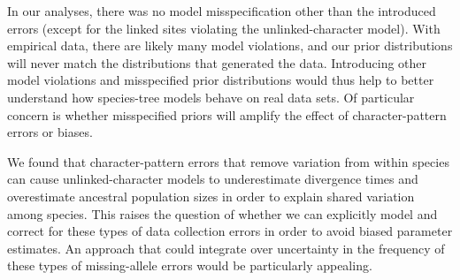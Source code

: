 In our analyses, there was no model misspecification other than the introduced
errors (except for the linked sites violating the unlinked-character model).
With empirical data, there are likely many model violations,
and our prior distributions will never match the distributions that generated
the data.
Introducing other model violations and misspecified prior distributions
would thus help to better understand how species-tree models behave on real
data sets.
Of particular concern is whether misspecified priors will amplify the effect of
character-pattern errors or biases.

We found that character-pattern errors that remove variation from within
species can cause unlinked-character models to underestimate divergence
times and overestimate ancestral population sizes in order to explain shared
variation among species.
This raises the question of whether we can explicitly model and correct for
these types of data collection errors in order to avoid biased parameter
estimates.
An approach that could integrate over uncertainty in the frequency of these
types of missing-allele errors would be particularly appealing.


